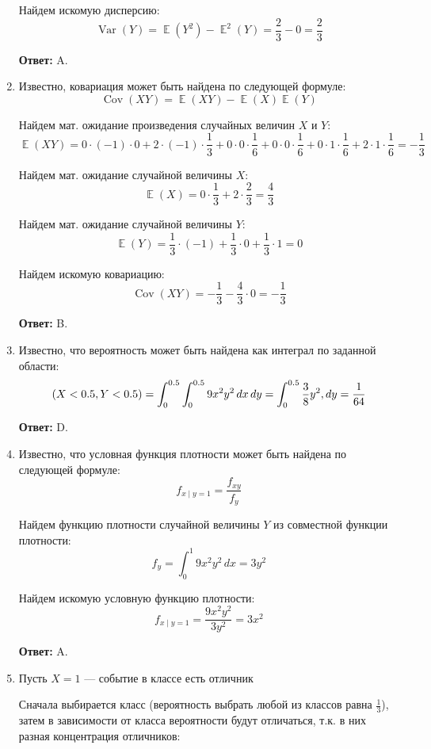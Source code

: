 \documentclass[a4paper]{article} %
\DeclareMathOperator{\Var}{Var}
\DeclareMathOperator{\Cov}{Cov}
\DeclareMathOperator{\E}{\mathbb{E}}
\let\P\relax
\DeclareMathOperator{\P}{\mathbb{P}}
\begin{document}
\begin{enumerate}
    Найдем искомую дисперсию:
    \[
    \Var(Y) = \E(Y^2) - \E^2(Y) = \frac{2}{3} - 0 = \frac{2}{3}
    \]
    
    \textbf{Ответ:} A.
    
    
    \item
    Известно, ковариация может быть найдена по следующей формуле:
    \[
    \Cov(XY) = \E(XY) - \E(X)\E(Y)
    \]
    
    Найдем мат. ожидание произведения случайных величин $X$ и $Y$:
    \[
    \E(XY) = 0\cdot(-1)\cdot0 + 2\cdot(-1)\cdot\frac{1}{3} + 0\cdot0\cdot\frac{1}{6} + 0\cdot0\cdot\frac{1}{6} + 0\cdot1\cdot\frac{1}{6} + 2\cdot1\cdot\frac{1}{6} = -\frac{1}{3}
    \]
    
    Найдем мат. ожидание случайной величины $X$:
    \[
    \E(X) = 0\cdot\frac{1}{3} + 2\cdot\frac{2}{3} = \frac{4}{3}
    \]
    
    Найдем мат. ожидание случайной величины $Y$:
    \[
    \E(Y) = \frac{1}{3} \cdot (-1) + \frac{1}{3} \cdot 0 + \frac{1}{3} \cdot 1 = 0
    \]
    
    Найдем искомую ковариацию:
    \[
    \Cov(XY) = -\frac{1}{3} - \frac{4}{3}\cdot0 = -\frac{1}{3}
    \]
    
    \textbf{Ответ:} B.
    
    
    \item
    Известно, что вероятность может быть найдена как интеграл по заданной области:
    \[
    \P(X<0.5, Y<0.5) = \int_{0}^{0.5}\int_{0}^{0.5} 9x^2y^2 \,dx\,dy = \int_{0}^{0.5} \frac{3}{8}y^2 ,dy = \frac{1}{64}
    \]
    
    \textbf{Ответ:} D.
    
    
    \item
    Известно, что условная функция плотности может быть найдена по следующей формуле:
    \[
    f_{x\mid y=1} = \frac{f_{xy}}{f_{y}}
    \]
    
    Найдем функцию плотности случайной величины $Y$ из совместной функции плотности:
    \[
    f_{y} = \int_{0}^{1} 9x^2y^2 \,dx = 3y^2
    \]
    
    Найдем искомую условную функцию плотности:
    \[
    f_{x\mid y=1} = \frac{9x^2y^2}{3y^2} = 3x^2
    \]
    
    \textbf{Ответ:} A.
    
    
    \item
    Пусть $X=1$ — событие в классе есть отличник
    
    Сначала выбирается класс (вероятность выбрать любой из классов равна $\frac{1}{3}$), затем в зависимости от класса вероятности будут отличаться, т.к. в них разная концентрация отличников:
    

\end{enumerate}
\end{document}
